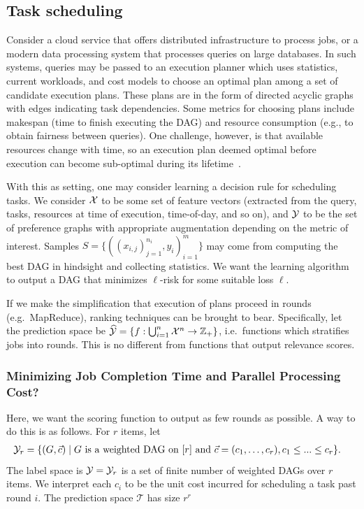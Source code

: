 
\subsection{Task scheduling}
Consider a cloud service that offers distributed infrastructure to process
jobs, or a modern data processing system that processes queries on large
databases.
In such systems, queries may be passed to an execution planner
which uses statistics, current workloads, and cost models to choose an optimal
plan among a set of candidate execution plans.
These plans are in the form of directed acyclic graphs with edges indicating
task dependencies.
Some metrics for choosing plans include makespan (time to finish executing
the DAG) and resource consumption (e.g., to obtain fairness between queries).
One challenge, however, is that available resources change with time,
so an execution plan deemed optimal before execution can become sub-optimal
during its lifetime~\cite{osdi-qoop}.

With this as setting, one may consider learning a decision rule for
scheduling tasks.
We consider ${\mathcal X}$ to be some set of feature vectors
(extracted from the query, tasks, resources at time of execution,
time-of-day, and so on), and ${\mathcal Y}$ to be the set of preference graphs with
appropriate augmentation depending on the metric of interest. Samples
$S = \{((x_{i,j})_{j=1}^{n_i}, y_i)_{i=1}^m\}$ may come from computing the best DAG
in hindsight and collecting statistics. We want the learning algorithm to
output a DAG that minimizes $\ell$-risk for some suitable loss $\ell$.

If we make the simplification that execution of plans proceed in rounds (e.g.\
MapReduce), ranking techniques can be brought to bear. Specifically,
let the prediction space be
$\widehat{\mathcal{Y}} = \{f: \bigcup_{i=1}^n {\mathcal X}^n \to \mathbb{Z}_+\}$,
i.e.\ functions which stratifies jobs into rounds. This is no different from
functions that output relevance scores.

\subsubsection{Minimizing Job Completion Time and Parallel Processing Cost?}
Here, we want the scoring function to output as few rounds as possible.
A way to do this is as follows. For $r$ items, let
\begin{align*}
  {\mathcal Y}_r &= \{ (G, \vec{c})
  \mid \text{$G$ is a weighted DAG on $[r]$ and $\vec{c} =( c_1, \ldots, c_r), c_1\leq ...\leq c_r$}
  \}.
\end{align*}
The label space is ${\mathcal Y} = {\mathcal Y}_r$ is a set of finite number of weighted DAGs over $r$ items. We interpret each $c_i$
to be the unit cost incurred for scheduling a task past round $i$.  The prediction space $\mathcal{T}$ has size $r^r$

